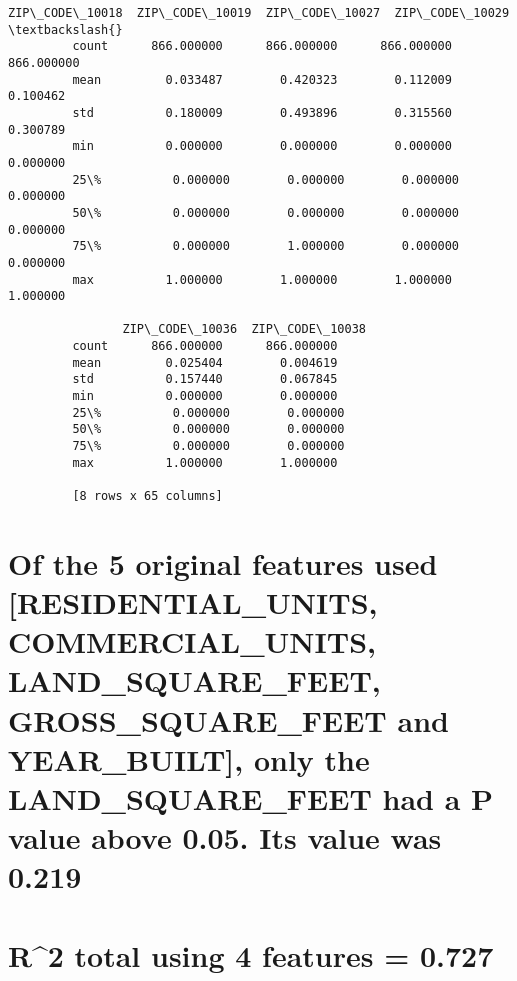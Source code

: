 \documentclass[11pt]{article}
\begin{document}
\begin{Verbatim}[commandchars=\\\{\}]
                ZIP\_CODE\_10018  ZIP\_CODE\_10019  ZIP\_CODE\_10027  ZIP\_CODE\_10029  \textbackslash{}
         count      866.000000      866.000000      866.000000      866.000000   
         mean         0.033487        0.420323        0.112009        0.100462   
         std          0.180009        0.493896        0.315560        0.300789   
         min          0.000000        0.000000        0.000000        0.000000   
         25\%          0.000000        0.000000        0.000000        0.000000   
         50\%          0.000000        0.000000        0.000000        0.000000   
         75\%          0.000000        1.000000        0.000000        0.000000   
         max          1.000000        1.000000        1.000000        1.000000   
         
                ZIP\_CODE\_10036  ZIP\_CODE\_10038  
         count      866.000000      866.000000  
         mean         0.025404        0.004619  
         std          0.157440        0.067845  
         min          0.000000        0.000000  
         25\%          0.000000        0.000000  
         50\%          0.000000        0.000000  
         75\%          0.000000        0.000000  
         max          1.000000        1.000000  
         
         [8 rows x 65 columns]
\end{Verbatim}
            
    \hypertarget{of-the-5-original-features-used-residential_units-commercial_units-land_square_feet-gross_square_feet-and-year_built-only-the-land_square_feet-had-a-p-value-above-0.05.-its-value-was-0.219}{%
\section{Of the 5 original features used {[}RESIDENTIAL\_UNITS,
COMMERCIAL\_UNITS, LAND\_SQUARE\_FEET, GROSS\_SQUARE\_FEET and
YEAR\_BUILT{]}, only the LAND\_SQUARE\_FEET had a P value above 0.05.
Its value was
0.219}\label{of-the-5-original-features-used-residential_units-commercial_units-land_square_feet-gross_square_feet-and-year_built-only-the-land_square_feet-had-a-p-value-above-0.05.-its-value-was-0.219}}

\hypertarget{r2-total-using-4-features-0.727}{%
\section{R\^{}2 total using 4 features =
0.727}\label{r2-total-using-4-features-0.727}}
\end{document}
